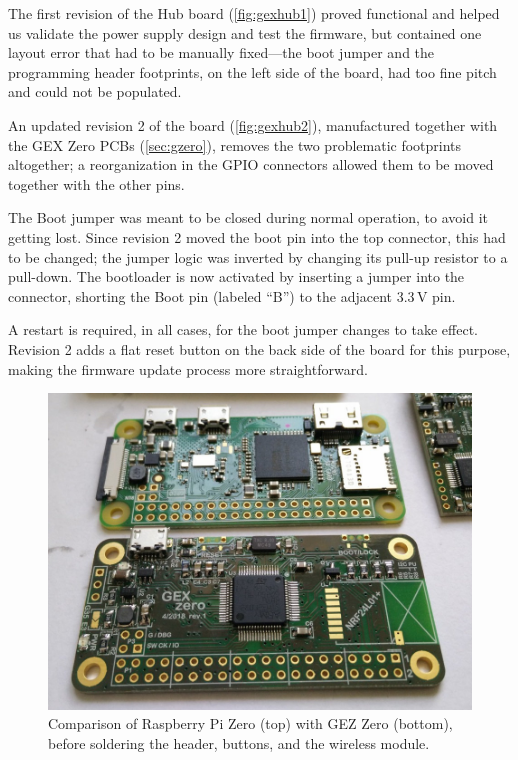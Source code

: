 The first revision of the Hub board (\cref{fig:gexhub1}) proved functional and helped us validate the power supply design and test the firmware, but contained one layout error that had to be manually fixed---the boot jumper and the programming header footprints, on the left side of the board, had too fine pitch and could not be populated.

An updated revision 2 of the board (\cref{fig:gexhub2}), manufactured together with the GEX Zero \glspl{PCB} (\cref{sec:gzero}), removes the two problematic footprints altogether; a reorganization in the \gls{GPIO} connectors allowed them to be moved together with the other pins. 

The Boot jumper was meant to be closed during normal operation, to avoid it getting lost. Since revision 2 moved the boot pin into the top connector, this had to be changed; the jumper logic was inverted by changing its pull-up resistor to a pull-down. The bootloader is now activated by inserting a jumper into the connector, shorting the Boot pin (labeled ``B'') to the adjacent 3.3\,V pin.

A restart is required, in all cases, for the boot jumper changes to take effect. Revision 2 adds a flat reset button on the back side of the board for this purpose, making the firmware update process more straightforward.

\begin{figure}[h]
	\centering
	\includegraphics[width=.9\textwidth]{img/photo-zero-pi-compare.jpg}
	\caption[GEX Zero compared to Raspberry Pi Zero]{\label{fig:zpicompare}Comparison of Raspberry Pi Zero (top) with GEZ Zero (bottom), before soldering the header, buttons, and the wireless module.}
\end{figure}

